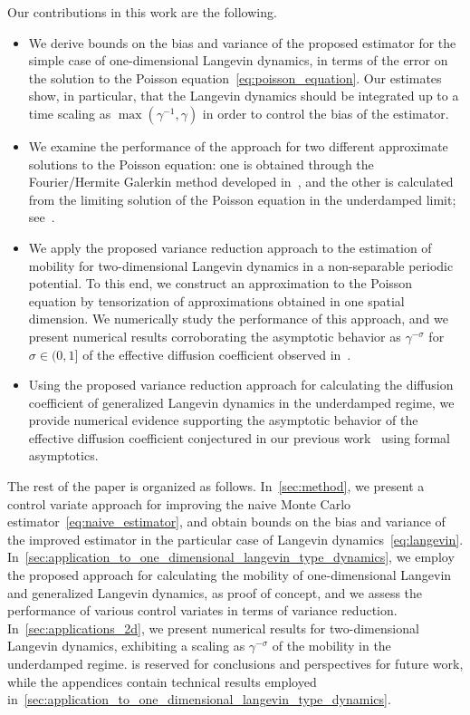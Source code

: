 \documentclass[11pt,a4paper]{article}
\begin{document}
Our contributions in this work are the following.
\begin{itemize}
    \item
        We derive bounds on the bias and variance of the proposed estimator for the simple case of one-dimensional Langevin dynamics,
        in terms of the error on the solution to the Poisson equation~\eqref{eq:poisson_equation}.
        Our estimates show, in particular, that the Langevin dynamics should be integrated up to a time scaling as $\max(\gamma^{-1}, \gamma)$ in order to control the bias of the estimator.
    \item
        We examine the performance of the approach for two different approximate solutions to the Poisson equation:
        one is obtained through the Fourier/Hermite Galerkin method developed in~\cite{roussel2018spectral},
        and the other is calculated from the limiting solution of the Poisson equation in the underdamped limit;
        see~\cite{MR2427108}.
    \item
        We apply the proposed variance reduction approach to the estimation of mobility for two-dimensional Langevin dynamics in a non-separable periodic potential.
        To this end, we construct an approximation to the Poisson equation by tensorization of approximations obtained in one spatial dimension.
        We numerically study the performance of this approach,
        and we present numerical results corroborating the asymptotic behavior as $\gamma^{-\sigma}$ for $\sigma \in (0, 1]$ of the effective diffusion coefficient
        observed in~\cite{roussel_thesis}.
    \item
        Using the proposed variance reduction approach
        for calculating the diffusion coefficient of generalized Langevin dynamics in the underdamped regime,
        we provide numerical evidence supporting the asymptotic behavior of the effective diffusion coefficient conjectured in our previous work~\cite{GPGSUV21} using formal asymptotics.
\end{itemize}
The rest of the paper is organized as follows.
In~\cref{sec:method},
we present a control variate approach for improving the naive Monte Carlo estimator~\eqref{eq:naive_estimator},
and obtain bounds on the bias and variance of the improved estimator in the particular case of Langevin dynamics~\eqref{eq:langevin}.
In~\cref{sec:application_to_one_dimensional_langevin_type_dynamics},
we employ the proposed approach for calculating the mobility of one-dimensional Langevin and generalized Langevin dynamics,
as proof of concept,
and we assess the performance of various control variates in terms of variance reduction.
In~\cref{sec:applications_2d},
we present numerical results for two-dimensional Langevin dynamics,
exhibiting a scaling as $\gamma^{-\sigma}$ of the mobility in the underdamped regime.
 is reserved for conclusions and perspectives for future work,
while the appendices contain technical results employed in~\cref{sec:application_to_one_dimensional_langevin_type_dynamics}.
\end{document}
